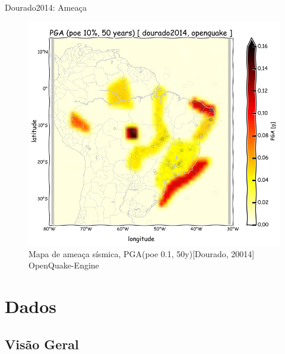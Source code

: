 \documentclass[ucs,8pt]{beamer}
\begin{document}
\begin{frame}{Dourado2014: Ameaça}
\begin{figure}[H]
  \centering
  \includegraphics[height=.95\textheight]{pga_dourado_oq} 
  \caption{Mapa de ameaça sísmica, PGA(poe 0.1, 50y)[Dourado, 20014] OpenQuake-Engine }
  \label{fig:pga_dourado_oq} 
\end{figure}
\end{frame}



\section{Dados}
\subsection{Visão Geral}
\end{document}
